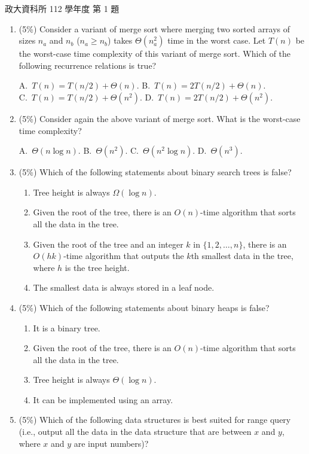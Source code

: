 \begin{pastexam}[label={px:nccu-112-dsa-01}]{政大資科所 112 學年度 第 1 題}
\begin{enumerate}[label=\arabic*),itemsep=2pt,topsep=2pt]
\item (5\%) Consider a variant of merge sort where merging two sorted arrays of sizes $n_a$ and
$n_b$ ($n_a\ge n_b$) takes $\Theta(n_a^2)$ time in the worst case. Let $T(n)$ be the worst-case
time complexity of this variant of merge sort. Which of the following recurrence relations is true?

A.~$T(n)=T(n/2)+\Theta(n)$. \qquad B.~$T(n)=2T(n/2)+\Theta(n)$.\\
C.~$T(n)=T(n/2)+\Theta(n^2)$. \qquad D.~$T(n)=2T(n/2)+\Theta(n^2)$.

\item (5\%) Consider again the above variant of merge sort. What is the worst-case time complexity?

A.~$\Theta(n\log n)$. \qquad B.~$\Theta(n^2)$. \qquad C.~$\Theta(n^2\log n)$. \qquad D.~$\Theta(n^3)$.

\item (5\%) Which of the following statements about binary search trees is false?
\begin{enumerate}[label=\Alph*.,itemsep=0pt,topsep=2pt]
\item Tree height is always $\Omega(\log n)$.
\item Given the root of the tree, there is an $O(n)$-time algorithm that sorts all the data in the tree.
\item Given the root of the tree and an integer $k$ in $\{1,2,\dots,n\}$, there is an $O(hk)$-time
algorithm that outputs the $k$th smallest data in the tree, where $h$ is the tree height.
\item The smallest data is always stored in a leaf node.
\end{enumerate}

\item (5\%) Which of the following statements about binary heaps is false?
\begin{enumerate}[label=\Alph*.,itemsep=0pt,topsep=2pt]
\item It is a binary tree.
\item Given the root of the tree, there is an $O(n)$-time algorithm that sorts all the data in the tree.
\item Tree height is always $\Theta(\log n)$.
\item It can be implemented using an array.
\end{enumerate}

\item (5\%) Which of the following data structures is best suited for range query (i.e., output
all the data in the data structure that are between $x$ and $y$, where $x$ and $y$ are input numbers)?


\end{enumerate}
\end{pastexam}
